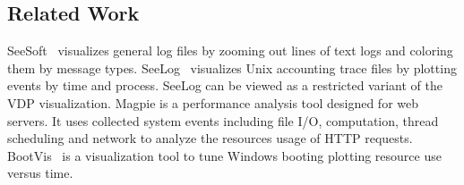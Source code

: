 \subsection{Related Work}
\label{sec:lviz-related}




SeeSoft~\cite{eick1994graphical} visualizes general log files by zooming out
lines of text logs and coloring them by message types.
SeeLog~\cite{eick1996displaying} visualizes Unix accounting trace files by
plotting events by time and process.
SeeLog can be viewed as a restricted variant of the
VDP visualization.
Magpie \cite{barham2004using} is a performance analysis tool designed for web servers.
It uses collected system events including file I/O, computation,
thread scheduling and network to analyze the resources usage of
HTTP requests.
BootVis~\cite{bootvis} 
is a visualization tool to tune
Windows booting plotting resource use versus time.

